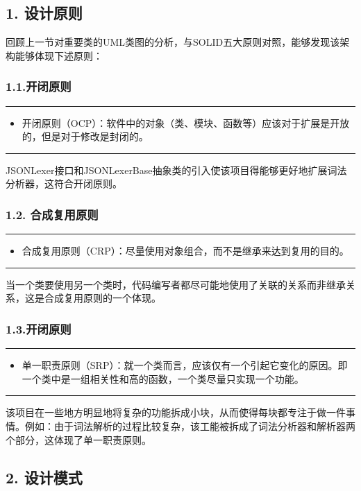\documentclass{article}
\begin{document}
\subsection*{1.	设计原则}
回顾上一节对重要类的UML类图的分析，与SOLID五大原则对照，能够发现该架构能够体现下述原则：
\subsubsection*{1.1.开闭原则}
\noindent \rule{\textwidth}{0.7mm}
\begin{itemize}
\item 开闭原则（OCP）：软件中的对象（类、模块、函数等）应该对于扩展是开放的，但是对于修改是封闭的。
\end{itemize}
\rule{\textwidth}{0.7mm}
JSONLexer接口和JSONLexerBase抽象类的引入使该项目得能够更好地扩展词法分析器，这符合开闭原则。

\subsubsection*{1.2. 合成复用原则}
\noindent \rule{\textwidth}{0.7mm}
\begin{itemize}
\item 合成复用原则（CRP）：尽量使用对象组合，而不是继承来达到复用的目的。
\end{itemize}
\rule{\textwidth}{0.7mm}
当一个类要使用另一个类时，代码编写者都尽可能地使用了关联的关系而非继承关系，这是合成复用原则的一个体现。

\subsubsection*{1.3.开闭原则}
\noindent \rule{\textwidth}{0.7mm}
\begin{itemize}
\item 单一职责原则（SRP）：就一个类而言，应该仅有一个引起它变化的原因。即一个类中是一组相关性和高的函数，一个类尽量只实现一个功能。
\end{itemize}
\rule{\textwidth}{0.7mm}
该项目在一些地方明显地将复杂的功能拆成小块，从而使得每块都专注于做一件事情。例如：由于词法解析的过程比较复杂，该工能被拆成了词法分析器和解析器两个部分，这体现了单一职责原则。

\subsection*{2. 设计模式}
\end{document}
